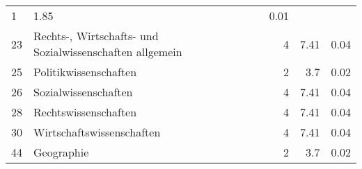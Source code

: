 \begin{longtable}{lXrrr}
       \num{1} &
       \num[round-mode=places,round-precision=2]{1,85} &
         \num[round-mode=places,round-precision=2]{0,01} \\

     23 &
     \multicolumn{1}{X}{ Rechts-, Wirtschafts- und Sozialwissenschaften allgemein   } &


       \num{4} &
       \num[round-mode=places,round-precision=2]{7,41} &
         \num[round-mode=places,round-precision=2]{0,04} \\

     25 &
     \multicolumn{1}{X}{ Politikwissenschaften   } &


       \num{2} &
       \num[round-mode=places,round-precision=2]{3,7} &
         \num[round-mode=places,round-precision=2]{0,02} \\

     26 &
     \multicolumn{1}{X}{ Sozialwissenschaften   } &


       \num{4} &
       \num[round-mode=places,round-precision=2]{7,41} &
         \num[round-mode=places,round-precision=2]{0,04} \\

     28 &
     \multicolumn{1}{X}{ Rechtswissenschaften   } &


       \num{4} &
       \num[round-mode=places,round-precision=2]{7,41} &
         \num[round-mode=places,round-precision=2]{0,04} \\

     30 &
     \multicolumn{1}{X}{ Wirtschaftswissenschaften   } &


       \num{4} &
       \num[round-mode=places,round-precision=2]{7,41} &
         \num[round-mode=places,round-precision=2]{0,04} \\

     44 &
     \multicolumn{1}{X}{ Geographie   } &


       \num{2} &
       \num[round-mode=places,round-precision=2]{3,7} &
         \num[round-mode=places,round-precision=2]{0,02} \\


\end{longtable}
